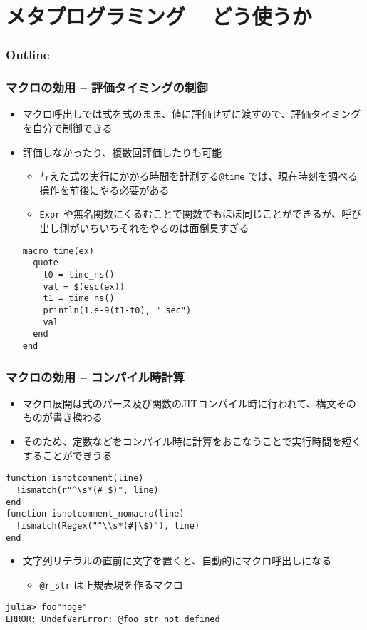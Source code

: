 \section{メタプログラミング -- どう使うか}
\begin{frame}
  \frametitle{Outline}
  \tableofcontents[currentsection]
\end{frame}

\begin{frame}[containsverbatim]
\frametitle{マクロの効用 -- 評価タイミングの制御}
\begin{itemize}
  \item マクロ呼出しでは式を式のまま、値に評価せずに渡すので、評価タイミングを自分で制御できる
  \item 評価しなかったり、複数回評価したりも可能
    \begin{itemize}
      \item 与えた式の実行にかかる時間を計測する\verb|@time| では、現在時刻を調べる操作を前後にやる必要がある
      \item \verb|Expr| や無名関数にくるむことで関数でもほぼ同じことができるが、呼び出し側がいちいちそれをやるのは面倒臭すぎる
    \end{itemize}
\begin{lstlisting}
macro time(ex)
  quote
    t0 = time_ns()
    val = $(esc(ex))
    t1 = time_ns()
    println(1.e-9(t1-t0), " sec")
    val
  end
end
\end{lstlisting}
\end{itemize}
\end{frame}

\begin{frame}[containsverbatim]
\frametitle{マクロの効用 -- コンパイル時計算}
\begin{itemize}
    \item マクロ展開は式のパース及び関数のJITコンパイル時に行われて、構文そのものが書き換わる
    \item そのため、定数などをコンパイル時に計算をおこなうことで実行時間を短くすることができうる
\end{itemize}
\begin{lstlisting}
function isnotcomment(line)
  !ismatch(r"^\s*(#|$)", line)
end
function isnotcomment_nomacro(line)
  !ismatch(Regex("^\\s*(#|\$)"), line)
end
\end{lstlisting}
\begin{itemize}
  \item 文字列リテラルの直前に文字を置くと、自動的にマクロ呼出しになる
    \begin{itemize}
      \item \verb|@r_str| は正規表現を作るマクロ
    \end{itemize}
\end{itemize}
\begin{lstlisting}
julia> foo"hoge"
ERROR: UndefVarError: @foo_str not defined
\end{lstlisting}
\end{frame}


